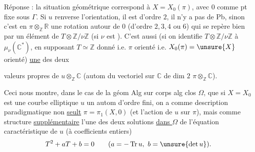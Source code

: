 Réponse : la situation géométrique 
correspond à \(X=X_0(\pi)\), avec \(0\) comme pt fixe sous \(\Gamma\).
Si \(u\) renverse l'orientation, il est d'ordre  \(2\),
il n'y a pas de Pb, sinon c'est  en
\(\pi\otimes_{\mathbb Z}\mathbb R\) une rotation autour de \(0\)
(d'ordre \(2,3,4\) ou \(6\)) qui se repère bien par un élément
de  \(T\otimes\mathbb Z/\nu\mathbb Z\)
(si \(\nu\) est ).
C'est aussi (si on identifie
\(T\otimes\mathbb Z/\nu\mathbb Z\) à
\(\mu_\nu(\mathbb C^*)\), en supposant
\(T\simeq\mathbb Z\) donné
i.e. \(\pi\) orienté i.e. \(X_0(\pi)=\unsure{X}\)
orienté) \uline{une} des deux


valeurs propres de \(u\otimes_{\mathbb Z}\mathbb C\)
(autom du vectoriel sur \(\mathbb C\) de dim \(2\)
\(\pi\otimes_{\mathbb Z}\mathbb C\)).

Ceci nous montre, dans le cas de la géom Alg sur corps alg clos
\(\Omega\), que si \(X=X_0\) est une courbe elliptique
\(u\) un autom d'ordre fini, on a comme description
paradigmatique non \uline{seult}
\(\pi=\pi_1(X,0)\)
(et l'action de \(u\) sur \(\pi\)), mais comme structure
\uline{supplémentaire} l'une des deux solutions \uline{dans \(\Omega\)}
de l'équation caractéristique de \(u\) (à coefficients entiers)
\[
T^2+aT+b=0
\qquad (a=-\operatorname{Tr}u,\ b=\unsure{\det u}).
\]

